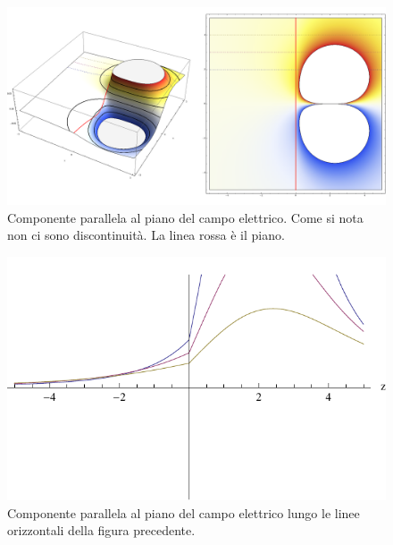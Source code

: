 \begin{Es}
\begin{figure}[htbp]
  \label{fig:campo_piano_dielettrico}
 \end{figure}
 \begin{figure}[htbp]
  \centering
  \includegraphics[scale=0.2]{immagini/fisica2/campo_due_dielettrici2}
  \caption{Componente parallela al piano del campo elettrico. Come si nota non ci sono discontinuità. La linea rossa è il piano.}
  \label{fig:campo_piano_dielettrico2}
 \end{figure}
 
 \begin{figure}[htbp]
  \centering
  \includegraphics{immagini/fisica2/campo_due_dielettrici4}
  \caption{Componente parallela al piano del campo elettrico lungo le linee orizzontali della figura precedente.}
  \label{fig:campo_piano_dielettrico4}
 \end{figure}
 

\end{Es}
